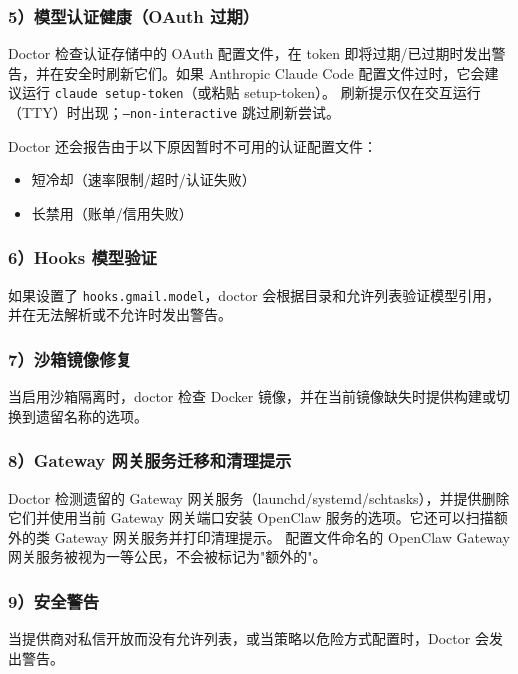 \subsubsection{5）模型认证健康（OAuth 过期）}


Doctor 检查认证存储中的 OAuth 配置文件，在 token 即将过期/已过期时发出警告，并在安全时刷新它们。如果 Anthropic Claude Code 配置文件过时，它会建议运行 \texttt{claude setup-token}（或粘贴 setup-token）。
刷新提示仅在交互运行（TTY）时出现；\texttt{--non-interactive} 跳过刷新尝试。

Doctor 还会报告由于以下原因暂时不可用的认证配置文件：

\begin{itemize}
  \item 短冷却（速率限制/超时/认证失败）
  \item 长禁用（账单/信用失败）
\end{itemize}


\subsubsection{6）Hooks 模型验证}


如果设置了 \texttt{hooks.gmail.model}，doctor 会根据目录和允许列表验证模型引用，并在无法解析或不允许时发出警告。

\subsubsection{7）沙箱镜像修复}


当启用沙箱隔离时，doctor 检查 Docker 镜像，并在当前镜像缺失时提供构建或切换到遗留名称的选项。

\subsubsection{8）Gateway 网关服务迁移和清理提示}


Doctor 检测遗留的 Gateway 网关服务（launchd/systemd/schtasks），并提供删除它们并使用当前 Gateway 网关端口安装 OpenClaw 服务的选项。它还可以扫描额外的类 Gateway 网关服务并打印清理提示。
配置文件命名的 OpenClaw Gateway 网关服务被视为一等公民，不会被标记为"额外的"。

\subsubsection{9）安全警告}


当提供商对私信开放而没有允许列表，或当策略以危险方式配置时，Doctor 会发出警告。

